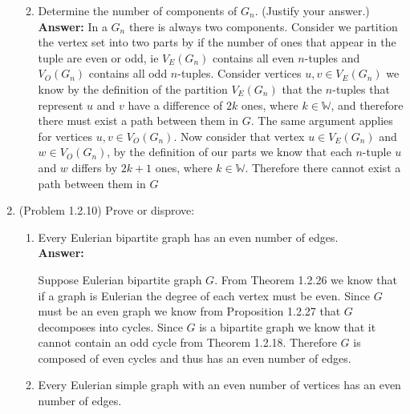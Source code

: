 \documentclass{amsart}
\def\WW{{\mathbb W}}
\begin{document}
\begin{enumerate}
\begin{enumerate}
	\vspace{0.25in}
	
	\item Determine the number of components of $G_n.$ (Justify your answer.)\\
	\textbf{Answer:} In a $G_n$ there is always two components. Consider we partition the vertex set into two parts by if the number of ones that appear in the tuple are even or odd, ie $V_{E}(G_n)$ contains all even $n$-tuples and $V_{O}(G_n)$ contains all odd $n$-tuples. Consider vertices $u,v \in V_{E}(G_n)$ we know by the definition of the partition $V_{E}(G_n)$ that the $n$-tuples that represent $u$ and $v$ have a difference of $2k$ ones, where $k \in \WW$, and therefore there must exist a path between them in $G$. The same argument applies for vertices $u,v \in V_{O}(G_n)$. Now consider that vertex $u \in V_{E}(G_n)$ and $w \in V_{O}(G_n)$, by the definition of our parts we know that each $n$-tuple $u$ and $w$ differs by $2k+1$ ones, where $k \in \WW$. Therefore there cannot exist a path between them in $G$
	
	\vspace{0.25in}
	
	\end{enumerate}

\item (Problem 1.2.10) Prove or disprove:
	\begin{enumerate}
	\item Every Eulerian bipartite graph has an even number of edges.\\
	\textbf{Answer:} 
	
	
	
	
	
	 Suppose Eulerian bipartite graph $G$. From Theorem 1.2.26 we know that if a graph is Eulerian the degree of each vertex must be even. Since $G$ must be an even graph we know from Proposition 1.2.27 that $G$ decomposes into cycles. Since $G$ is a bipartite graph we know that it cannot contain an odd cycle from Theorem 1.2.18. Therefore $G$ is composed of even cycles and thus has an even number of edges. 
	
	\vspace{0.25in}
	
	\item Every Eulerian simple graph with an even number of vertices has an even number of edges.\\







\end{enumerate}
\end{enumerate}
\end{document}
